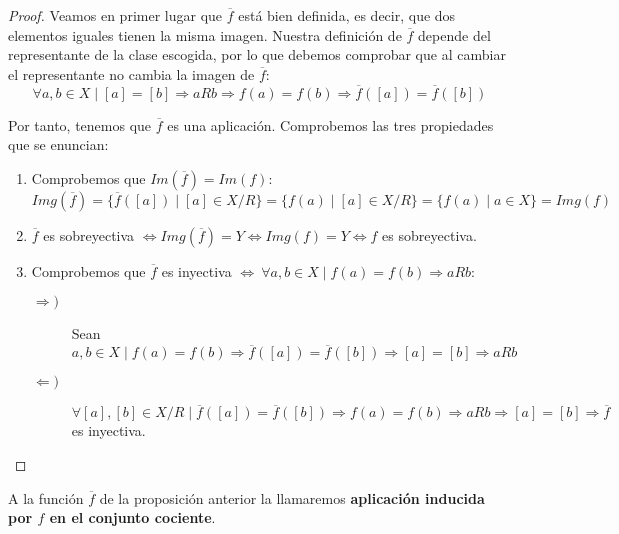 \begin{proof}
    Veamos en primer lugar que $\overline{f}$ está bien definida, es decir, que dos elementos iguales tienen la misma imagen. Nuestra definición de $\overline{f}$ depende del representante de la clase escogida, por lo que debemos comprobar que al cambiar el representante no cambia la imagen de $\overline{f}$:
    $$\forall a, b \in X \mid [a] = [b] \Rightarrow aRb \Rightarrow f(a) = f(b) \Rightarrow \overline{f}([a]) = \overline{f}([b])$$

    Por tanto, tenemos que $\overline{f}$ es una aplicación. Comprobemos las tres propiedades que se enuncian:
    \begin{enumerate}
        \item Comprobemos que $Im(\overline{f})=Im(f)$:
        $$Img(\overline{f}) = \{\overline{f}([a]) \mid [a] \in X/R\} = \{f(a) \mid [a] \in X/R\} = \{f(a) \mid a \in X\} = Img(f)$$

        \item $\overline{f}$ es sobreyectiva $\Longleftrightarrow Img(\overline{f}) = Y \Longleftrightarrow Img(f) = Y \Longleftrightarrow f$ es sobreyectiva.

        \item Comprobemos que $\overline{f}$ es inyectiva $\Longleftrightarrow~\forall a,b \in X \mid f(a) = f(b) \Rightarrow aRb$:
        \begin{description}
            \item[$\Longrightarrow)$] Sean $a,b \in X \mid f(a) = f(b) \Rightarrow \overline{f}([a]) = \overline{f}([b]) \Rightarrow [a] = [b] \Rightarrow aRb$

            \item[$\Longleftarrow)$] $\forall [a], [b] \in X/R \mid \overline{f}([a]) = \overline{f}([b]) \Rightarrow f(a) = f(b) \Rightarrow aRb \Rightarrow [a] = [b] \Rightarrow \overline{f}$ es inyectiva.
        \end{description}
    \end{enumerate}
\end{proof}

A la función $\overline{f}$ de la proposición anterior la llamaremos \textbf{aplicación inducida por $f$ en el conjunto cociente}.
